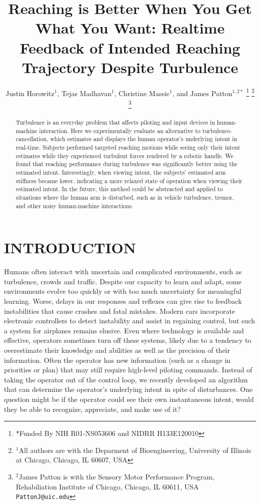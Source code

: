 \documentclass[letterpaper, 10 pt, conference]{ieeeconf}  %
\title{\LARGE \bf
Reaching is Better When You Get What You Want: Realtime Feedback of Intended Reaching Trajectory Despite Turbulence
}
\author{Justin Horowitz$^{1}$, Tejas Madhavan$^{1}$, Christine Massie$^{1}$, and James Patton$^{1,2*}$%
\thanks{*Funded By NIH R01-NS053606 and NIDRR H133E120010}%
\thanks{$^{1}$All authors are with the Deparment of Bioengineering, University of Illinois at Chicago, 
		Chicago, IL 60607, USA 
		}
\thanks{$^{2}$James Patton is with the Sensory Motor Performance Program, Rehabiliation Institute of Chicago,
       Chicago, IL 60611, USA
       {\tt\small PattonJ@uic.edu}}%
}
\begin{document}
\maketitle
\thispagestyle{empty}
\pagestyle{empty}


\begin{abstract}
Turbulence is an everyday problem that affects piloting and input devices in human-machine interaction. Here we experimentally evaluate an alternative to turbulence-cancellation, which estimates and displays the human operator's underlying intent in real-time. Subjects performed targeted reaching motions while seeing only their intent estimates while they experienced turbulent forces rendered by a robotic handle. We found that reaching performance during turbulence was significantly better using the estimated intent. Interestingly, when viewing intent, the subjects' estimated arm stiffness became lower, indicating a more relaxed state of operation when viewing their estimated intent. In the future, this method could be abstracted and applied to situations where the human arm is disturbed, such as in vehicle turbulence, tremor, and other noisy human-machine interactions.
\end{abstract}


\section{INTRODUCTION}

Humans often interact with uncertain and complicated environments, such as turbulence, crowds and traffic. Despite our capacity to learn and adapt, some environments evolve too quickly or with too much uncertainty for meaningful learning. Worse, delays in our responses and reflexes can give rise to feedback instabilities that cause crashes and fatal mistakes\cite{mcruer1995pilot}. Modern cars incorporate electronic controllers to detect instability and assist in regaining control\cite{lie2006effectiveness}, but such a system for airplanes remains elusive\cite{newman2012thirty}. Even where technology is available and effective, operators sometimes turn off these systems\cite{itoh2013evaluation}, likely due to a tendency to overestimate their knowledge and abilities as well as the precision of their information\cite{del2012decision}. Often the operator has new information (such as a change in priorities or plan) that may still require high-level piloting commands. Instead of taking the operator out of the control loop, we recently developed an algorithm \cite{horowitz2015determining} that can determine the operator's underlying intent in spite of disturbances. One question might be if the operator could see their own instantaneous intent, would they be able to recognize, appreciate, and make use of it? 
\end{document}
